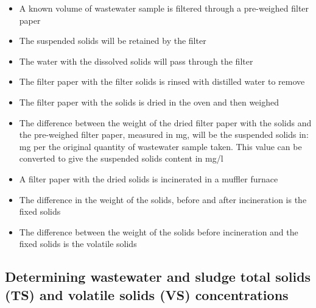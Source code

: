 				\begin{itemize}
					\item A known volume of wastewater sample is filtered through a pre-weighed filter paper
					\item The suspended solids will be retained by the filter
					\item The water with the dissolved solids will pass through the filter
					\item The filter paper with the filter solids is rinsed with distilled water to remove 
					\item The filter paper with the solids is dried in the oven and then weighed
					\item The difference between the weight of the dried filter paper with the solids and the pre-weighed filter paper, measured in mg, will be the suspended solids in: mg per the original quantity of wastewater sample taken.  This value can be converted to give the suspended solids content in mg/l
					\item A filter paper with the dried solids is incinerated in a muffler furnace
					\item The difference in the weight of the solids, before and after incineration is the fixed solids
					\item The difference between the weight of the solids before incineration and the fixed solids is the volatile solids
				\end{itemize}
				
	\subsection{Determining wastewater and sludge total solids (TS) and volatile solids (VS) concentrations}				
				
